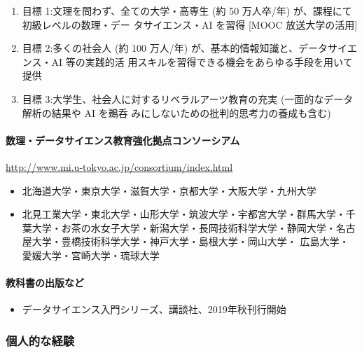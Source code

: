 \documentclass[
]{bxjsbook}
\providecommand{\tightlist}{%
  \setlength{\itemsep}{0pt}\setlength{\parskip}{0pt}}
\theoremstyle{definition}
\theoremstyle{definition}
\theoremstyle{definition}
\theoremstyle{definition}
\theoremstyle{remark}
\begin{document}
\begin{enumerate}
\def\labelenumi{\arabic{enumi}.}
\item
  目標 1:文理を問わず、全ての大学・高専生 (約 50 万人卒/年) が、課程にて初級レベルの数理・デー タサイエンス・AI を習得 {[}MOOC 放送大学の活用{]}
\item
  目標 2:多くの社会人 (約 100 万人/年) が、基本的情報知識と、データサイエンス・AI 等の実践的活 用スキルを習得できる機会をあらゆる手段を用いて提供
\item
  目標 3:大学生、社会人に対するリベラルアーツ教育の充実 (一面的なデータ解析の結果や AI を鵜呑 みにしないための批判的思考力の養成も含む)
\end{enumerate}

\hypertarget{ux6570ux7406ux30c7ux30fcux30bfux30b5ux30a4ux30a8ux30f3ux30b9ux6559ux80b2ux5f37ux5316ux62e0ux70b9ux30b3ux30f3ux30bdux30fcux30b7ux30a2ux30e0}{%
\paragraph{数理・データサイエンス教育強化拠点コンソーシアム}\label{ux6570ux7406ux30c7ux30fcux30bfux30b5ux30a4ux30a8ux30f3ux30b9ux6559ux80b2ux5f37ux5316ux62e0ux70b9ux30b3ux30f3ux30bdux30fcux30b7ux30a2ux30e0}}

\url{http://www.mi.u-tokyo.ac.jp/consortium/index.html}

\begin{itemize}
\item
  北海道大学・東京大学・滋賀大学・京都大学・大阪大学・九州大学
\item
  北見工業大学・東北大学・山形大学・筑波大学・宇都宮大学・群馬大学・千葉大学・お茶の水女子大学・新潟大学・長岡技術科学大学・静岡大学・名古屋大学・豊橋技術科学大学・神戸大学・島根大学・岡山大学・ 広島大学・愛媛大学・宮崎大学・琉球大学
\end{itemize}

\hypertarget{ux6559ux79d1ux66f8ux306eux51faux7248ux306aux3069}{%
\paragraph{教科書の出版など}\label{ux6559ux79d1ux66f8ux306eux51faux7248ux306aux3069}}

\begin{itemize}
\tightlist
\item
  データサイエンス入門シリーズ、講談社、2019年秋刊行開始
\end{itemize}

\hypertarget{ux500bux4ebaux7684ux306aux7d4cux9a13}{%
\subsubsection{個人的な経験}\label{ux500bux4ebaux7684ux306aux7d4cux9a13}}
\end{document}
